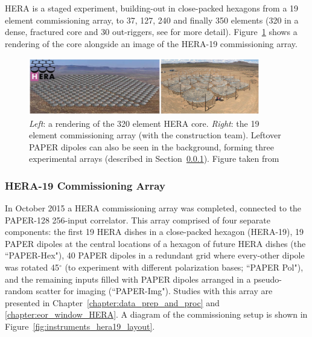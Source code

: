 HERA is a staged experiment, building-out in close-packed hexagons from a 19 element commissioning array, to 37, 127, 240 and finally 350 elements (320 in a dense, fractured core and 30 out-riggers, see \citep{Dillon.16} for more detail). Figure~\ref{fig:instruments_hera_layout} shows a rendering of the core alongside an image of the HERA-19 commissioning array.

\begin{figure}
\centering
\includegraphics[width=0.9\textwidth]{chapters/instruments/figures/HERAlayout_deBoer.png}
\caption[Future vision and physical commissioning HERA layout.]{\textit{Left}: a rendering of the 320 element HERA core. \textit{Right}: the 19 element commissioning array (with the construction team). Leftover PAPER dipoles can also be seen in the background, forming three experimental arrays (described in Section~\ref{subsubsec:instruments_hera19}). Figure taken from \cite{deBoer.17}}
\label{fig:instruments_hera_layout}
\end{figure}

\subsubsection{HERA-19 Commissioning Array}
\label{subsubsec:instruments_hera19}

In October 2015 a HERA commissioning array was completed, connected to the PAPER-128 256-input correlator. This array comprised of four separate components: the first 19 HERA dishes in a close-packed hexagon (HERA-19), 19 PAPER dipoles at the central locations of a hexagon of future HERA dishes (the ``PAPER-Hex"), 40 PAPER dipoles in a redundant grid where every-other dipole was rotated 45$^{\circ}$ (to experiment with different polarization bases; ``PAPER Pol"), and the remaining inputs filled with PAPER dipoles arranged in a pseudo-random scatter for imaging (``PAPER-Img"). Studies with this array are presented in Chapter~\ref{chapter:data_prep_and_proc} and \ref{chapter:eor_window_HERA}. A diagram of the commissioning setup is shown in Figure~\ref{fig:instruments_hera19_layout}.

